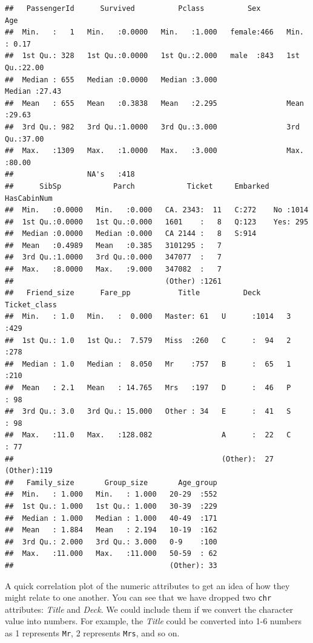 \documentclass[
]{book}
\begin{document}
\begin{verbatim}
##   PassengerId      Survived          Pclass          Sex           Age       
##  Min.   :   1   Min.   :0.0000   Min.   :1.000   female:466   Min.   : 0.17  
##  1st Qu.: 328   1st Qu.:0.0000   1st Qu.:2.000   male  :843   1st Qu.:22.00  
##  Median : 655   Median :0.0000   Median :3.000                Median :27.43  
##  Mean   : 655   Mean   :0.3838   Mean   :2.295                Mean   :29.63  
##  3rd Qu.: 982   3rd Qu.:1.0000   3rd Qu.:3.000                3rd Qu.:37.00  
##  Max.   :1309   Max.   :1.0000   Max.   :3.000                Max.   :80.00  
##                 NA's   :418                                                  
##      SibSp            Parch            Ticket     Embarked HasCabinNum
##  Min.   :0.0000   Min.   :0.000   CA. 2343:  11   C:272    No :1014   
##  1st Qu.:0.0000   1st Qu.:0.000   1601    :   8   Q:123    Yes: 295   
##  Median :0.0000   Median :0.000   CA 2144 :   8   S:914               
##  Mean   :0.4989   Mean   :0.385   3101295 :   7                       
##  3rd Qu.:1.0000   3rd Qu.:0.000   347077  :   7                       
##  Max.   :8.0000   Max.   :9.000   347082  :   7                       
##                                   (Other) :1261                       
##   Friend_size      Fare_pp           Title          Deck       Ticket_class
##  Min.   : 1.0   Min.   :  0.000   Master: 61   U      :1014   3      :429  
##  1st Qu.: 1.0   1st Qu.:  7.579   Miss  :260   C      :  94   2      :278  
##  Median : 1.0   Median :  8.050   Mr    :757   B      :  65   1      :210  
##  Mean   : 2.1   Mean   : 14.765   Mrs   :197   D      :  46   P      : 98  
##  3rd Qu.: 3.0   3rd Qu.: 15.000   Other : 34   E      :  41   S      : 98  
##  Max.   :11.0   Max.   :128.082                A      :  22   C      : 77  
##                                                (Other):  27   (Other):119  
##   Family_size       Group_size       Age_group  
##  Min.   : 1.000   Min.   : 1.000   20-29  :552  
##  1st Qu.: 1.000   1st Qu.: 1.000   30-39  :229  
##  Median : 1.000   Median : 1.000   40-49  :171  
##  Mean   : 1.884   Mean   : 2.194   10-19  :162  
##  3rd Qu.: 2.000   3rd Qu.: 3.000   0-9    :100  
##  Max.   :11.000   Max.   :11.000   50-59  : 62  
##                                    (Other): 33
\end{verbatim}

A quick correlation plot of the numeric attributes to get an idea of how they might relate to one another. You can see that we have dropped two \texttt{chr} attributes: \emph{Title} and \emph{Deck}. We could include them if we convert the character value into numbers. For example, the \emph{Title} could be converted into 1-6 numbers as 1 represents \texttt{Mr}, 2 represents \texttt{Mrs}, and so on.
\end{document}
